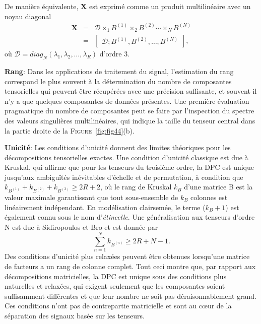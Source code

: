 \documentclass[11pt,a4paper,oneside]{book}
\newcommand{\mbf}[1]{\mathbf{#1}}
\newcommand{\figref}[1]{\textsc{Figure}~\ref{#1}}
\begin{document}
De manière équivalente, $ \mbf{X} $ est exprimé comme un produit multilinéaire avec un noyau diagonal
\begin{eqnarray}
\mbf{X}&=&\mathcal{D}\times_{1}B^{(1)}\times_{2}B^{(2)}\cdots\times_{N}B^{(N)}\nonumber\\
&=&\begin{bmatrix}
\mathcal{D};B^{(1)},B^{(2)},\dots,B^{(N)}\label{3BSS}
\end{bmatrix},
\end{eqnarray}
où $ \mathcal{D}=diag_{N}(\lambda_{1},\lambda_{2},\dots,\lambda_{R}) $
d'ordre 3.

\textbf{Rang}: Dans les applications de traitement du signal, l'estimation du rang correspond le plus souvent à la détermination du nombre de composantes tensorielles qui peuvent être récupérées avec une précision suffisante, et souvent il n'y a que quelques composantes de données présentes. Une première évaluation pragmatique du nombre de composantes peut se faire par l'inspection du spectre des valeurs singulières multilinéaires, qui indique la taille du tenseur central dans la partie droite de la \figref{fig:fig44}(b). 

\textbf{Unicité}: 
Les conditions d'unicité donnent des limites théoriques pour les décompositions tensorielles exactes. Une condition d'unicité classique est due à Kruskal, qui affirme que pour les tenseurs du troisième ordre, la DPC est unique jusqu'aux ambiguïtés inévitables d'échelle et de permutation, à condition que $ k_{B^{(1)}}+k_{B^{(2)}}+k_{B^{(3)}}\geq 2R+2 $, où le rang de Kruskal $ k_{B} $ d'une matrice B est la valeur maximale garantissant que tout sous-ensemble de $ k_{B} $ colonnes est linéairement indépendant. En modélisation clairsemée, le terme ($ k_{B}+ 1 $) est également connu sous le nom d'\textit{étincelle}. Une généralisation aux tenseurs d'ordre N est due à Sidiropoulos et Bro  et est donnée par
\begin{equation*}
	\sum_{n=1}^{N}k_{B^{(n)}}\geq 2R+N-1.
\end{equation*}
Des conditions d'unicité plus relaxées peuvent être obtenues lorsqu'une matrice de facteurs a un rang de colonne complet. Tout ceci montre que, par rapport aux décompositions matricielles, la DPC est unique sous des conditions plus naturelles et relaxées, qui exigent seulement que les composantes soient suffisamment différentes et que leur nombre ne soit pas déraisonnablement grand. Ces conditions n'ont pas de contrepartie matricielle et sont au cœur de la séparation des signaux basée sur les tenseurs.\\
\end{document}
